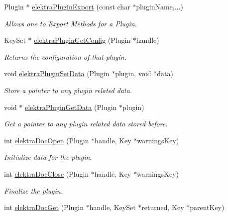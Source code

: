 \begin{DoxyCompactItemize}
\item 
Plugin $\ast$ \hyperlink{group__plugin_ga8dd092048e972a3f0c9c9f54eb41576e}{elektra\+Plugin\+Export} (const char $\ast$plugin\+Name,...)
\begin{DoxyCompactList}\small\item\em Allows one to Export Methods for a Plugin. \end{DoxyCompactList}\item 
Key\+Set $\ast$ \hyperlink{group__plugin_ga644bead796506c172817724051c977c9}{elektra\+Plugin\+Get\+Config} (Plugin $\ast$handle)
\begin{DoxyCompactList}\small\item\em Returns the configuration of that plugin. \end{DoxyCompactList}\item 
void \hyperlink{group__plugin_gaf4b941a52ff55d0ca2a9158d90208ef2}{elektra\+Plugin\+Set\+Data} (Plugin $\ast$plugin, void $\ast$data)
\begin{DoxyCompactList}\small\item\em Store a pointer to any plugin related data. \end{DoxyCompactList}\item 
void $\ast$ \hyperlink{group__plugin_gaafcf3216b46292f222b8cc7828b4dd20}{elektra\+Plugin\+Get\+Data} (Plugin $\ast$plugin)
\begin{DoxyCompactList}\small\item\em Get a pointer to any plugin related data stored before. \end{DoxyCompactList}\item 
int \hyperlink{group__plugin_ga23c2eb3584e38a4d494eb8f91e5e3d8d}{elektra\+Doc\+Open} (Plugin $\ast$handle, Key $\ast$warnings\+Key)
\begin{DoxyCompactList}\small\item\em Initialize data for the plugin. \end{DoxyCompactList}\item 
int \hyperlink{group__plugin_ga1236aefe5b2baf8b7bf636ba5aa9ea29}{elektra\+Doc\+Close} (Plugin $\ast$handle, Key $\ast$warnings\+Key)
\begin{DoxyCompactList}\small\item\em Finalize the plugin. \end{DoxyCompactList}\item 
int \hyperlink{group__plugin_gacb69f3441c6d84241b4362f958fbe313}{elektra\+Doc\+Get} (Plugin $\ast$handle, Key\+Set $\ast$returned, Key $\ast$parent\+Key)

\end{DoxyCompactItemize}
